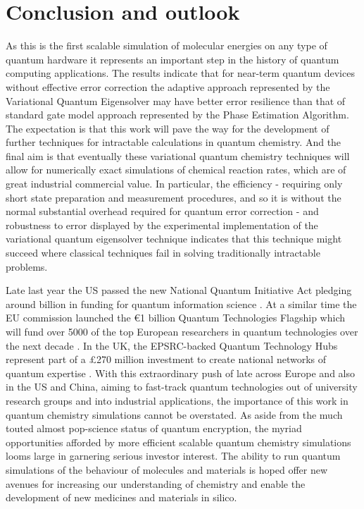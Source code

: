 \documentclass[12pt]{article}
\begin{document}
\section{Conclusion and outlook}
As this is the first scalable simulation of molecular energies on any type of quantum hardware it represents an important step in the history of
quantum computing applications. The results indicate that for near-term quantum devices without effective error correction the adaptive approach
represented by the Variational Quantum Eigensolver may have better error resilience than that of standard gate model approach represented by the
Phase Estimation Algorithm. The expectation is that this work will pave the way for the development of further techniques for intractable calculations
 in quantum chemistry. And the final aim is that eventually these variational quantum chemistry techniques will allow for numerically exact simulations
  of chemical reaction rates, which are of great industrial commercial value. In particular, the efficiency - requiring only short state preparation
   and measurement procedures, and so it is without the normal substantial overhead required for quantum error correction - and robustness to
   error displayed by the experimental implementation of the variational quantum eigensolver technique indicates that this technique might succeed
    where classical techniques fail in solving traditionally intractable problems.

Late last year the US passed the new National Quantum Initiative Act pledging around  billion in funding for quantum information science
 \cite{usbill}. At a similar time the EU commission launched the €1 billion Quantum Technologies Flagship which will fund over 5000 of the top
 European researchers in quantum technologies over the next decade \cite{eubill}. In the UK, the EPSRC-backed Quantum Technology Hubs represent
 part of a £270 million investment to create national networks of quantum expertise \cite{ukbill}. With this extraordinary push of late across
 Europe and also in the US and China, aiming to fast-track quantum technologies out of university research groups and into industrial applications,
  the importance of this work in quantum chemistry simulations cannot be overstated. As aside from the much touted almost pop-science status of
  quantum encryption, the myriad opportunities afforded by more efficient scalable quantum chemistry simulations looms large in garnering serious
   investor interest. The ability to run quantum simulations of the behaviour of molecules and materials is hoped offer new avenues for increasing
    our understanding of chemistry and enable the development of new medicines and materials in silico.





\end{document}
